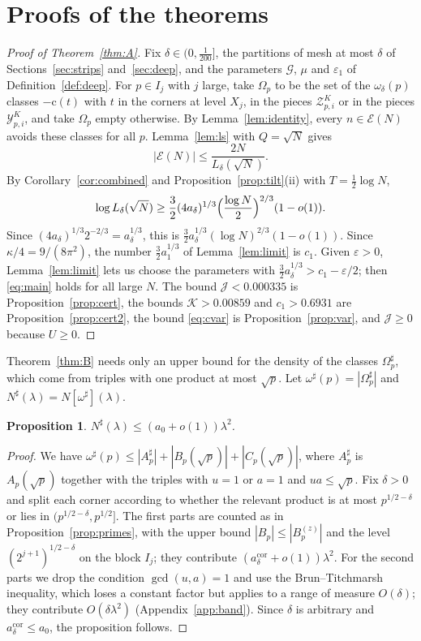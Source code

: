 \documentclass[aps,prd,twocolumn,superscriptaddress,nofootinbib,longbibliography,floatfix,showkeys,nobalancelastpage,amsmath,amssymb,10pt]{revtex4-2}
\theoremstyle{plain}
\newtheorem{proposition}[theorem]{Proposition}
\theoremstyle{definition}
\theoremstyle{plain}
\newcommand{\eps}{\varepsilon}
\newcommand{\Ex}{\mathcal{E}}
\newcommand{\Zc}{\mathcal{Z}}
\newcommand{\Jc}{\mathcal{J}}
\newcommand{\Kc}{\mathcal{K}}
\newcommand{\Kbound}{0.00859}
\newcommand{\cbound}{0.6931}
\newcommand{\cl}{\mathrm{c}}
\begin{document}
\section{Proofs of the theorems}\label{sec:proofs}

\begin{proof}[Proof of Theorem~\ref{thm:A}]
Fix $\delta\in(0,\frac1{200}]$, the partitions of mesh at most $\delta$ of Sections~\ref{sec:strips} and~\ref{sec:deep}, and the parameters $\mathcal G$, $\mu$ and $\eps_1$ of Definition~\ref{def:deep}. For $p\in I_j$ with $j$ large, take $\Omega_p$ to be the set of the $\omega_\delta(p)$ classes $-\cl(t)$ with $t$ in the corners at level $X_j$, in the pieces $\Zc^K_{p,i}$ or in the pieces $\mathcal Y^K_{p,i}$, and take $\Omega_p$ empty otherwise. By Lemma~\ref{lem:identity}, every $n\in\Ex(N)$ avoids these classes for all $p$. Lemma~\ref{lem:ls} with $Q=\sqrt N$ gives
\[
|\Ex(N)|\le\frac{2N}{L_\delta(\sqrt N)}.
\]
By Corollary~\ref{cor:combined} and Proposition~\ref{prop:tilt}(ii) with $T=\frac12\log N$,
\[
\log L_\delta(\sqrt N)\ge\frac32(4a_\delta)^{1/3}\Bigl(\frac{\log N}2\Bigr)^{2/3}(1-o(1)).
\]
Since $(4a_\delta)^{1/3}2^{-2/3}=a_\delta^{1/3}$, this is $\frac32a_\delta^{1/3}(\log N)^{2/3}(1-o(1))$. Since $\kappa/4=9/(8\pi^2)$, the number $\frac32a_1^{1/3}$ of Lemma~\ref{lem:limit} is $c_1$. Given $\eps>0$, Lemma~\ref{lem:limit} lets us choose the parameters with $\frac32a_\delta^{1/3}>c_1-\eps/2$; then \eqref{eq:main} holds for all large $N$. The bound $\Jc<0.000335$ is Proposition~\ref{prop:cert}, the bounds $\Kc>\Kbound$ and $c_1>\cbound$ are Proposition~\ref{prop:cert2}, the bound \eqref{eq:cvar} is Proposition~\ref{prop:var}, and $\Jc\ge0$ because $U\ge0$.
\end{proof}

Theorem~\ref{thm:B} needs only an upper bound for the density of the classes $\Omega^\sharp_p$, which come from triples with one product at most $\sqrt p$. Let $\omega^\sharp(p)=|\Omega^\sharp_p|$ and $N^\sharp(\lambda)=N[\omega^\sharp](\lambda)$.

\begin{proposition}\label{prop:upper}
$N^\sharp(\lambda)\le(a_0+o(1))\lambda^2$.
\end{proposition}

\begin{proof}
We have $\omega^\sharp(p)\le|A^\sharp_p|+|B_p(\sqrt p)|+|C_p(\sqrt p)|$, where $A^\sharp_p$ is $A_p(\sqrt p)$ together with the triples with $u=1$ or $a=1$ and $ua\le\sqrt p$. Fix $\delta>0$ and split each corner according to whether the relevant product is at most $p^{1/2-\delta}$ or lies in $(p^{1/2-\delta},p^{1/2}]$. The first parts are counted as in Proposition~\ref{prop:primes}, with the upper bound $|B_p|\le|B^{(z)}_p|$ and the level $(2^{j+1})^{1/2-\delta}$ on the block $I_j$; they contribute $(a^{\mathrm{cor}}_\delta+o(1))\lambda^2$. For the second parts we drop the condition $\gcd(u,a)=1$ and use the Brun--Titchmarsh inequality, which loses a constant factor but applies to a range of measure $O(\delta)$; they contribute $O(\delta\lambda^2)$ (Appendix~\ref{app:band}). Since $\delta$ is arbitrary and $a^{\mathrm{cor}}_\delta\le a_0$, the proposition follows.
\end{proof}
\end{document}
